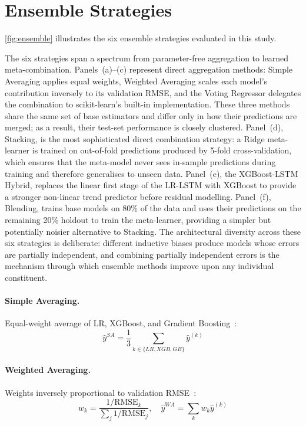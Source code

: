 \section{Ensemble Strategies}
\label{sec:ensembles}

\autoref{fig:ensemble} illustrates the six ensemble strategies evaluated in this study.

The six strategies span a spectrum from parameter-free aggregation to learned meta-combination. Panels~(a)--(c) represent direct aggregation methods: Simple Averaging applies equal weights, Weighted Averaging scales each model's contribution inversely to its validation RMSE, and the Voting Regressor delegates the combination to scikit-learn's built-in implementation. These three methods share the same set of base estimators and differ only in how their predictions are merged; as a result, their test-set performance is closely clustered. Panel~(d), Stacking, is the most sophisticated direct combination strategy: a Ridge meta-learner is trained on out-of-fold predictions produced by 5-fold cross-validation, which ensures that the meta-model never sees in-sample predictions during training and therefore generalises to unseen data. Panel~(e), the XGBoost-LSTM Hybrid, replaces the linear first stage of the LR-LSTM with XGBoost to provide a stronger non-linear trend predictor before residual modelling. Panel~(f), Blending, trains base models on 80\% of the data and uses their predictions on the remaining 20\% holdout to train the meta-learner, providing a simpler but potentially noisier alternative to Stacking. The architectural diversity across these six strategies is deliberate: different inductive biases produce models whose errors are partially independent, and combining partially independent errors is the mechanism through which ensemble methods improve upon any individual constituent.

\paragraph{Simple Averaging.} Equal-weight average of LR, XGBoost, and Gradient Boosting~\parencite{scikit-learn}:
\begin{equation}
 \hat{y}^{SA} = \frac{1}{3}\sum_{k \in \{LR, XGB, GB\}} \hat{y}^{(k)}
 \label{eq:simple_avg}
\end{equation}

\paragraph{Weighted Averaging.} Weights inversely proportional to validation RMSE~\parencite{breiman2001rf}:
\begin{equation}
 w_k = \frac{1/\text{RMSE}_k}{\sum_j 1/\text{RMSE}_j}, \quad \hat{y}^{WA} = \sum_k w_k \hat{y}^{(k)}
 \label{eq:weighted_avg}
\end{equation}

